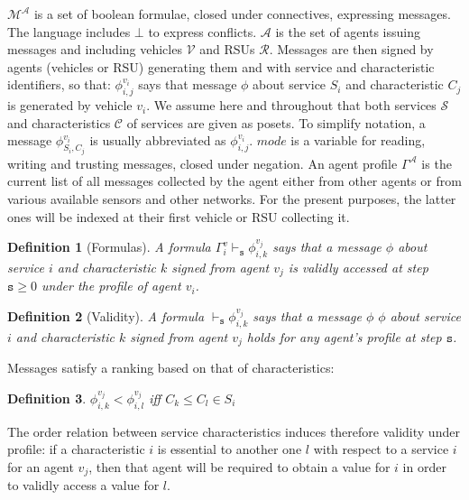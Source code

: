 \documentclass[compsoc, conference, letterpaper, 10pt, times]{IEEEtran}
\newtheorem{definition}{Definition}
\begin{document}
$\mathcal{M^{\mathcal{A}}}$ is a set of boolean formulae, closed under connectives, expressing messages. The language includes $\bot$ to express conflicts. $\mathcal{A}$ is the set of agents issuing messages and including vehicles $\mathcal{V}$ and RSUs $\mathcal{R}$. Messages are then signed by agents (vehicles or RSU) generating them and with service and characteristic identifiers, so that: $\phi^{v_{i}}_{i,j}$ says that message $\phi$ about service $S_{i}$ and characteristic $C_j$ is generated by vehicle $v_{i}$. We assume here and throughout that both services $\mathcal{S}$ and characteristics $\mathcal{C}$ of services are given as posets. To simplify notation, a message $\phi^{v_{i}}_{S_{i},C_{j}}$ is usually abbreviated as $\phi^{v_{i}}_{{i},{j}}$. $mode$ is a variable for reading, writing and trusting messages, closed under negation. An agent profile $\Gamma^{\mathcal{A}}$ is the current list of all messages collected by the agent either from other agents or from various available sensors and other networks. For the present purposes, the latter ones will be indexed at their first vehicle or RSU collecting it.


\begin{definition}[Formulas]
A formula $\Gamma^{v}_{i} \vdash_{\mathtt{s}} \phi^{v_{j}}_{i,k}$ says that a message $\phi$ about service $i$ and characteristic $k$ signed from agent $v_{j}$  is validly accessed at step $\mathtt{s}\geq 0$ under the profile of agent $v_{i}$.
\end{definition}

\begin{definition}[Validity]
A formula $\vdash_{\mathtt{s}} \phi^{v_{j}}_{i,k}$ says that a message $\phi$ $\phi$ about service $i$ and characteristic $k$ signed from agent $v_{j}$ holds for \textit{any} agent's profile at step $\mathtt{s}$.
\end{definition}

Messages satisfy a ranking based on that of characteristics:

\begin{definition}\label{def:dependencypackages}
$\phi^{v_{j}}_{i,k}<\phi^{v_{j}}_{i,l}$ iff $C_{k}\leq C_{l} \in S_{i}$ 
%
\end{definition}

The order relation between service characteristics induces therefore validity under profile: if a characteristic $i$ is essential to another one $l$ with respect to a service $i$ for an agent $v_{j}$, then that agent will be required to obtain a value for  $i$ in order to validly access a value for $l$. 
\end{document}
